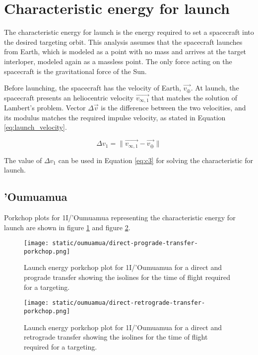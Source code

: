 \section{Characteristic energy for launch}

The characteristic energy for launch is the energy required to set a spacecraft
into the desired targeting orbit. This analysis assumes that the spacecraft
launches from Earth, which is modeled as a point with no mass and arrives at the
target interloper, modeled again as a massless point. The only force acting on
the spacecraft is the gravitational force of the Sun.

Before launching, the spacecraft has the velocity of Earth, $\vec{v_{\oplus}}$.
At launch, the spacecraft presents an heliocentric velocity $\vec{v_{\infty
,1}}$ that matches the solution of Lambert's problem. Vector $\Delta{\vec{v}}$
is the difference between the two velocities, and its modulus matches the
required impulse velocity, as stated in Equation \ref{eq:launch_velocity}.

\begin{equation}
    \Delta v_1 = \|\vec{v_{\infty ,1}} - \vec{v_{\oplus}}\|
    \label{eq:launch_velocity}
\end{equation}

The value of $\Delta v_1$ can be used in Equation \ref{eq:c3} for solving the
characteristic for launch.

\subsection{'Oumuamua}

Porkchop plots for 1I/'Oumuamua representing the characteristic energy for launch
are shown in figure \ref{fig:oumuamua-direct-prograde-transfer-porkchop} and
figure \ref{fig:oumuamua-direct-retrograde-transfer-porkchop}.

\begin{figure}[H]
  \centering
  \texttt{[image: static/oumuamua/direct-prograde-transfer-porkchop.png]}
        \caption[Direct and prograde launch energy porkchop for 'Oumuamua]{Launch energy porkchop plot for 1I/'Oumuamua for a direct and prograde
        transfer showing the isolines for
        the time of flight required for a targeting.}
  \label{fig:oumuamua-direct-prograde-transfer-porkchop}
\end{figure}

\begin{figure}[H]
  \centering
  \texttt{[image: static/oumuamua/direct-retrograde-transfer-porkchop.png]}
        \caption[Direct and retrograde launch energy porkchop for
        'Oumuamua]{Launch energy porkchop plot for 1I/'Oumuamua for a direct and
        retrograde transfer showing the isolines for
        the time of flight required for a targeting.}
  \label{fig:oumuamua-direct-retrograde-transfer-porkchop}
\end{figure}


